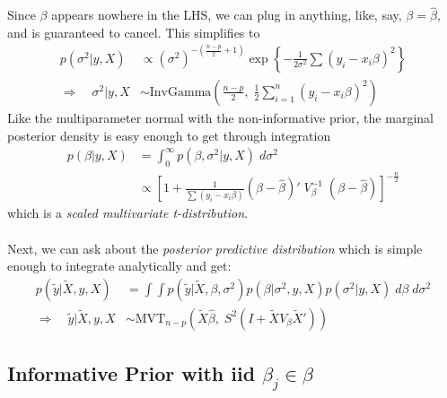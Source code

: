 \documentclass[12pt]{article}
\begin{document}
Since $\beta$ appears nowhere in the LHS, we can plug
in anything, like, say, $\beta = \hat{\beta}$, and is guaranteed to
cancel. This simplifies to
\begin{align*}
    p(\sigma^2 | y, X) &\propto (\sigma^2)^{-\left(\frac{n-p}{2}+ 1
      \right)} \exp\left\{ -\frac{1}{2\sigma^2} \sum (y_i - x_i \beta)^2
      \right\} \\
    \Rightarrow \quad \sigma^2 | y,X &\sim \text{InvGamma}\left(
      \frac{n-p}{2}, \; \frac{1}{2} \sum^n_{i=1} (y_i - x_i\beta)^2 
      \right) 
\end{align*}
Like the multiparameter normal with the non-informative prior, the
marginal posterior density is easy enough to get through integration
\begin{align*}
   p(\beta | y, X) &= \int^\infty_0 p(\beta, \sigma^2 |y, X)\; 
      d\sigma^2 \\
   &\propto \left[ 1+ \frac{1}{\sum (y_i - x_i\beta)} 
      (\beta - \hat{\beta})' \; V_\beta^{-1} \;(\beta - \hat{\beta})
      \right]^{-\frac{n}{2}}
\end{align*}
which is a \emph{scaled multivariate t-distribution}.
\\
\\
Next, we can ask about the \emph{posterior predictive distribution}
which is simple enough to integrate analytically and get:
\begin{align*}
   p(\tilde{y} | \tilde{X}, y, X) &= \int \int p(\tilde{y} | \tilde{X},
      \beta, \sigma^2 ) p(\beta | \sigma^2, y, X) p(\sigma^2|y, X)
      \; d\beta \; d\sigma^2 \\
      \Rightarrow \quad \tilde{y} | \tilde{X}, y, X &\sim 
      \text{MVT}_{n-p}(\tilde{X} \hat{\beta}, \;
      S^2( I + \tilde{X} V_\beta \tilde{X}'))
\end{align*}

\newpage
\subsection{Informative Prior with iid $\beta_j \in \beta$}
\end{document}
